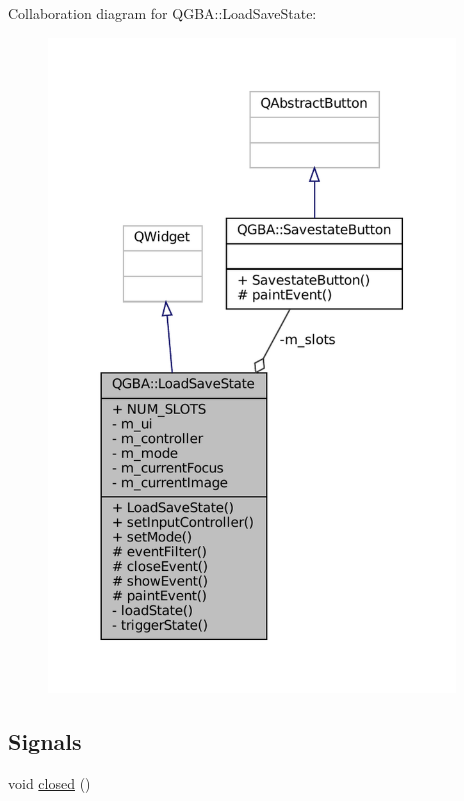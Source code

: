 Collaboration diagram for Q\+G\+BA\+:\+:Load\+Save\+State\+:
\nopagebreak
\begin{figure}[H]
\begin{center}
\leavevmode
\includegraphics[width=306pt]{class_q_g_b_a_1_1_load_save_state__coll__graph}
\end{center}
\end{figure}
\subsection*{Signals}
\begin{DoxyCompactItemize}
\item 
void \mbox{\hyperlink{class_q_g_b_a_1_1_load_save_state_a2f8bf8d005d4c4b37e1f510b069016b9}{closed}} ()
\end{DoxyCompactItemize}

